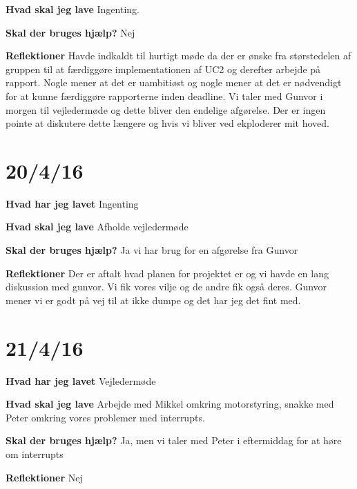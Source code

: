 \documentclass{article}
\begin{document}
	\textbf{Hvad skal jeg lave}
	Ingenting.
	
	\textbf{Skal der bruges hjælp?}
	Nej
	
	\textbf{Reflektioner}
	Havde indkaldt til hurtigt møde da der er ønske fra størstedelen af gruppen til at færdiggøre implementationen af UC2 og derefter arbejde på rapport. Nogle mener at det er uambitiøst og nogle mener at det er nødvendigt for at kunne færdiggøre rapporterne inden deadline. Vi taler med Gunvor i morgen til vejledermøde og dette bliver den endelige afgørelse. Der er ingen pointe at diskutere dette længere og hvis vi bliver ved ekploderer mit hoved.
	
	\section{20/4/16}
	\textbf{Hvad har jeg lavet}
	Ingenting
	
	\textbf{Hvad skal jeg lave}
	Afholde vejledermøde
	
	\textbf{Skal der bruges hjælp?}
	Ja vi har brug for en afgørelse fra Gunvor
	
	\textbf{Reflektioner}
	Der er aftalt hvad planen for projektet er og vi havde en lang diskussion med gunvor. Vi fik vores vilje og de andre fik også deres. Gunvor mener vi er godt på vej til at ikke dumpe og det har jeg det fint med. 
	
	\section{21/4/16}
	\textbf{Hvad har jeg lavet}
	Vejledermøde
	
	\textbf{Hvad skal jeg lave}
	Arbejde med Mikkel omkring motorstyring, snakke med Peter omkring vores problemer med interrupts.
	
	\textbf{Skal der bruges hjælp?}
	Ja, men vi taler med Peter i eftermiddag for at høre om interrupts 
	
	\textbf{Reflektioner}
	Nej
\end{document}
